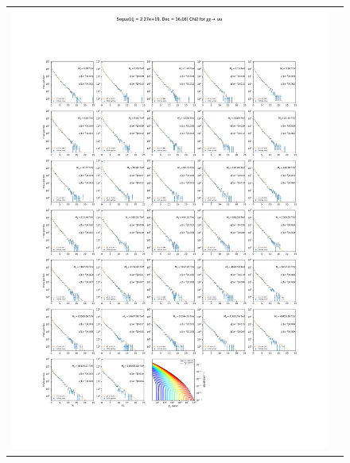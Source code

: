 \begin{figure}[ht]
{\begin{tabular}{cc}
            \includegraphics[clip, trim=22.1cm 6.5cm 19.5cm 56.5cm, scale=0.6]{figures/ic_DM/dm_plots/Segue1_uu_chi2_Masspanel_2024-04-28.pdf} &

\end{tabular}}
\end{figure}
